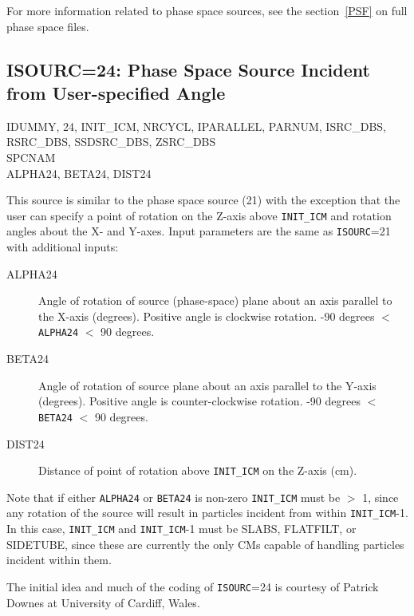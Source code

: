 \documentclass[12pt,twoside]{article}
\newcommand{\cen}[1]{\begin{center} #1 \end{center}                   }
\begin{document}
For more information related to phase space sources, see the
section~\ref{PSF} on full phase space files.

\clearpage
\subsection{ISOURC=24: Phase Space Source Incident from User-specified Angle}
\label{Source24}

\cen{IDUMMY, 24, INIT\_ICM, NRCYCL, IPARALLEL, PARNUM, ISRC\_DBS,
RSRC\_DBS, SSDSRC\_DBS, ZSRC\_DBS \\SPCNAM \\ALPHA24, BETA24, DIST24}

This source is similar to the phase space source (21) with the exception that the
user can specify a point of rotation on the Z-axis above {\tt INIT\_ICM} and rotation
angles about the X- and Y-axes.  Input parameters are the same as {\tt ISOURC}=21 with
additional inputs:
\begin{description}
\item [ALPHA24] Angle of rotation of source (phase-space) plane about an axis
parallel to the X-axis (degrees).
Positive angle is clockwise rotation. -90 degrees $<$ {\tt ALPHA24} $<$ 90 degrees.
\item [BETA24] Angle of rotation of source plane about an axis parallel to the Y-axis (degrees).  Positive angle
is counter-clockwise rotation. -90 degrees $<$ {\tt BETA24} $<$ 90 degrees.
\item [DIST24] Distance of point of rotation above {\tt INIT\_ICM} on the Z-axis (cm).
\end{description}

Note that if either {\tt ALPHA24} or {\tt BETA24} is non-zero {\tt INIT\_ICM} must be $>$ 1,
since any rotation of the source
will result in particles incident from within {\tt INIT\_ICM}-1.  In this case, {\tt INIT\_ICM}
and {\tt INIT\_ICM}-1 must be SLABS, FLATFILT, or SIDETUBE, since these are currently the
only CMs capable of handling particles incident within them.

The initial idea and much of the coding of {\tt ISOURC}=24 is courtesy of Patrick
Downes at University of Cardiff, Wales.
\end{document}

